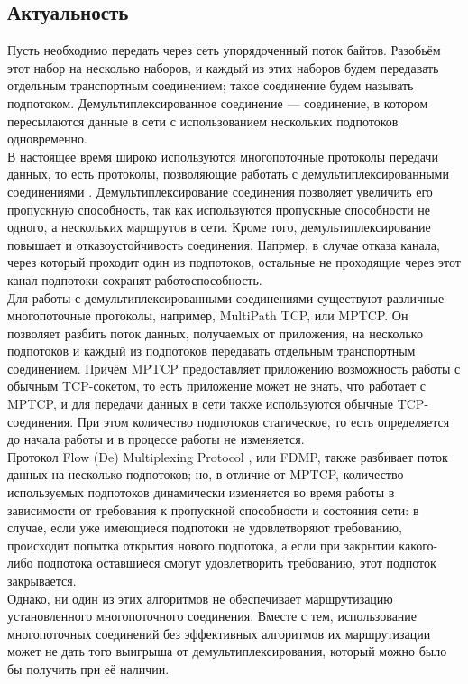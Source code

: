 \documentclass[a4paper]{article}
\begin{document}
\subsection{Актуальность}
Пусть необходимо передать через сеть упорядоченный поток байтов. Разобьём этот набор на несколько наборов, и каждый из этих наборов будем передавать отдельным транспортным соединением; такое соединение будем называть подпотоком. Демультиплексированное соединение --- соединение, в котором пересылаются данные в сети с использованием нескольких подпотоков одновременно.\\
В настоящее время широко используются многопоточные протоколы передачи данных, то есть протоколы, позволяющие работать с демультиплексированными соединениями \cite{mpusage}\cite{protos}. Демультиплексирование соединения позволяет увеличить его пропускную способность, так как используются пропускные способности не одного, а нескольких маршрутов в сети. Кроме того, демультиплексирование повышает и отказоустойчивость соединения. Напрмер, в случае отказа канала, через который проходит один из подпотоков, остальные не проходящие через этот канал подпотоки сохранят работоспособность.\\
Для работы с демультиплексированными соединениями существуют различные многопоточные протоколы, например, MultiPath TCP, или MPTCP\cite{mptcp}. Он позволяет разбить поток данных, получаемых от приложения, на несколько подпотоков и каждый из подпотоков передавать отдельным транспортным соединением. Причём MPTCP предоставляет приложению возможность работы с обычным TCP-сокетом, то есть приложение может не знать, что работает с MPTCP, и для передачи данных в сети также используются обычные TCP-соединения. При этом количество подпотоков статическое, то есть определяется до начала работы и в процессе работы не изменяется.\\
Протокол Flow (De) Multiplexing Protocol \cite{FDMP}, или FDMP, также разбивает поток  данных на несколько подпотоков; но, в отличие от MPTCP, количество используемых  подпотоков динамически изменяется во время работы в зависимости от требования к пропускной способности и состояния сети: в случае, если уже имеющиеся подпотоки не удовлетворяют требованию, происходит попытка открытия нового подпотока, а если при закрытии какого-либо подпотока оставшиеся смогут удовлетворить требованию, этот подпоток закрывается. \\Однако, ни один из этих алгоритмов не обеспечивает маршрутизацию установленного многопоточного соединения. Вместе с тем, использование многопоточных соединений без эффективных алгоритмов их маршрутизации может не дать того выигрыша от демультиплексирования, который можно было бы получить при её наличии.
\end{document}
